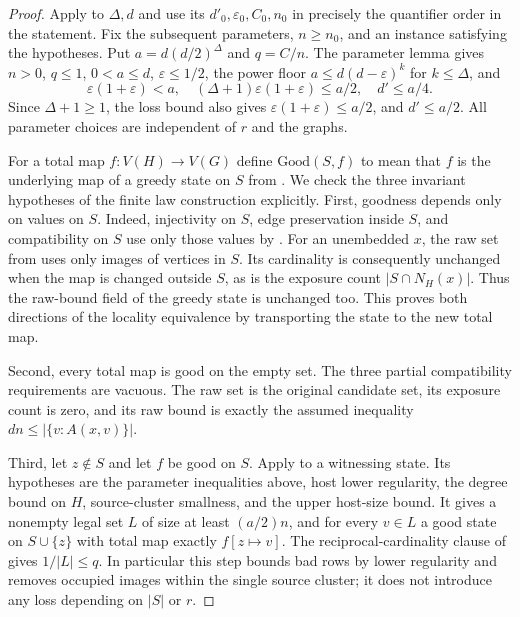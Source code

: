 \begin{proof}
Apply  to $\Delta,d$ and use its
$d'_0,\varepsilon_0,C_0,n_0$ in precisely the quantifier order in the
statement. Fix the subsequent parameters, $n\geq n_0$, and an instance
satisfying the hypotheses. Put $a=d(d/2)^\Delta$ and $q=C/n$.
The parameter lemma gives $n>0$, $q\leq1$, $0<a\leq d$,
$\varepsilon\leq1/2$, the power floor
$a\leq d(d-\varepsilon)^k$ for $k\leq\Delta$, and
\[
 \varepsilon(1+\varepsilon)<a,\quad
 (\Delta+1)\varepsilon(1+\varepsilon)\leq a/2,\quad d'\leq a/4.
\]
Since $\Delta+1\geq1$, the loss bound also gives
$\varepsilon(1+\varepsilon)\leq a/2$, and $d'\leq a/2$.
All parameter choices are independent of $r$ and the graphs.

For a total map $f:V(H)\to V(G)$ define $\mathrm{Good}(S,f)$ to mean
that $f$ is the underlying map of a greedy state on $S$ from
. We check the three invariant
hypotheses of the finite law construction explicitly.
First, goodness depends only on values on $S$. Indeed, injectivity
on $S$, edge preservation inside $S$, and compatibility on $S$ use
only those values by .
For an unembedded $x$, the raw set from 
uses only images of vertices in $S$. Its cardinality is consequently
unchanged when the map is changed outside $S$, as is the exposure
count $|S\cap N_H(x)|$. Thus the raw-bound field of the greedy state
is unchanged too. This proves both directions of the locality
equivalence by transporting the state to the new total map.

Second, every total map is good on the empty set. The three partial
compatibility requirements are vacuous. The raw set is the original
candidate set, its exposure count is zero, and its raw bound is
exactly the assumed inequality $dn\leq|\{v:A(x,v)\}|$.

Third, let $z\notin S$ and let $f$ be good on $S$.
Apply  to a witnessing state.
Its hypotheses are the parameter inequalities above, host lower
regularity, the degree bound on $H$, source-cluster smallness, and
the upper host-size bound. It gives a nonempty legal set $L$ of
size at least $(a/2)n$, and for every $v\in L$ a good state on
$S\cup\{z\}$ with total map exactly $f[z\mapsto v]$.
The reciprocal-cardinality clause of
 gives $1/|L|\leq q$.
In particular this step bounds bad rows by lower regularity and
removes occupied images within the single source cluster; it does
not introduce any loss depending on $|S|$ or $r$.


\end{proof}
